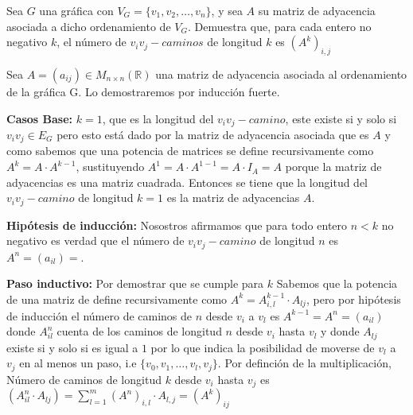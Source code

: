 Sea $G$ una gráfica con $V_G = \{v_1, v_2, \dots ,v_n\}$, y sea $A$ su matriz de adyacencia asociada a dicho ordenamiento de $V_G$. Demuestra que, para cada entero no negativo $k$, el número de $v_iv_j-caminos$ de longitud $k$ es $(A^k)_{i,j}$

Sea $A=(a_{ij})\in M_{n\times n}{(\mathbb{R})}$ una matriz de adyacencia asociada al ordenamiento de la gráfica G.
Lo demostraremos por inducción fuerte.

\textbf{Casos Base:} $k=1$, que es la longitud del $v_iv_j-camino$, este existe si y solo si $v_iv_j\in E_G$ pero esto está dado por la matriz de adyacencia asociada que es $A$ y como sabemos que una potencia de matrices se define recursivamente como $A^k=A\cdot A^{k-1}$, sustituyendo $A^1=A\cdot A^{1-1}=A\cdot I_A=A$ porque la matriz de adyacencias es una matriz cuadrada. Entonces se tiene que la longitud del $v_iv_j-camino$ de longitud $k=1$ es la matriz de adyacencias $A$.

\textbf{Hipótesis de inducción:} Nosostros afirmamos que para todo entero $n<k$ no negativo es verdad que el número de $v_iv_j-camino$ de longitud $n$ es $A^{n}=(a_{il})=$.

\textbf{Paso inductivo:} Por demostrar que se cumple para $k$
Sabemos que la potencia de una matriz de define recursivamente como $A^k=A^{k-1}_{i,l}\cdot A_{lj}$, pero por hipótesis de inducción el número de caminos de $n$ desde $v_i$ a $v_l$ es $A^{k-1}=A^{n}=(a_{il})$ donde $A^{n}_{il}$ cuenta de los caminos de longitud $n$ desde $v_i$ hasta $v_l$ y donde $A_{lj}$ existe si y solo si es igual a $1$ por lo que indica la posibilidad de moverse de $v_l$ a $v_j$ en al menos un paso, i.e $\{v_0,v_1,\dots,v_l,v_j\}$. 
Por definción de la multiplicación, Número de caminos de longitud $k$ desde  $v_i$ hasta  $v_j$ es $(A^{n}_{il}\cdot A_{lj}) =\sum_{l=1}^{m} (A^{n})_{i,l} \cdot A_{l,j} = (A^k)_{ij}$